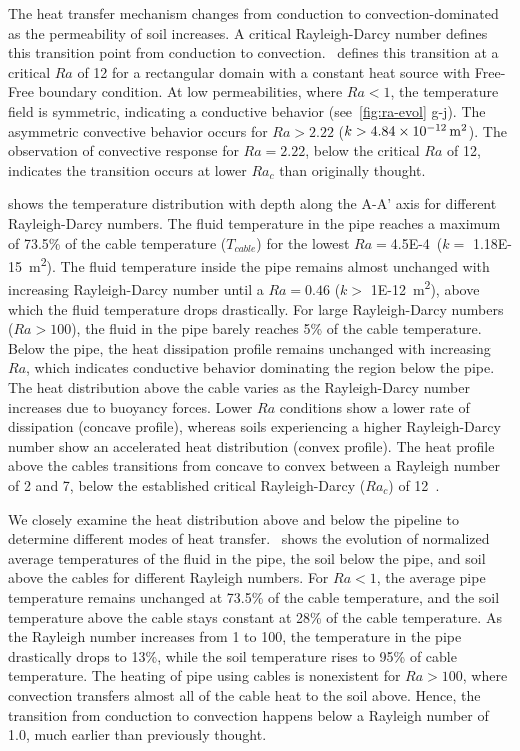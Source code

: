 \documentclass[Journal,letterpaper,InsideFigs]{ascelike-new}
\begin{document}
The heat transfer mechanism changes from conduction to convection-dominated as the permeability of soil increases. A critical Rayleigh-Darcy number defines this transition point from conduction to convection.~ defines this transition at a critical $Ra$ of 12 for a rectangular domain with a constant heat source with Free-Free boundary condition. At low permeabilities, where $Ra < 1$, the temperature field is symmetric, indicating a conductive behavior (see~\cref{fig:ra-evol} g-j). The asymmetric convective behavior occurs for $Ra > 2.22$ ($k > \SI{4.84E-12}{\meter\squared}$). The observation of convective response for $Ra = 2.22$, below the critical $Ra$ of 12, indicates the transition occurs at lower $Ra_c$ than originally thought. 

 shows the temperature distribution with depth along the A-A' axis for different Rayleigh-Darcy numbers. The fluid temperature in the pipe reaches a maximum of 73.5\% of the cable temperature ($T_{cable}$) for the lowest $Ra = $\SI{4.5E-4} ($k =$ \SI{1.18E-15}{\meter\squared}). The fluid temperature inside the pipe remains almost unchanged with increasing Rayleigh-Darcy number until a $Ra = 0.46$ ($k >$ \SI{1E-12}{\meter\squared}), above which the fluid temperature drops drastically. For large Rayleigh-Darcy numbers ($Ra > 100$), the fluid in the pipe barely reaches 5\% of the cable temperature. Below the pipe, the heat dissipation profile remains unchanged with increasing $Ra$, which indicates conductive behavior dominating the region below the pipe. The heat distribution above the cable varies as the Rayleigh-Darcy number increases due to buoyancy forces. Lower $Ra$ conditions show a lower rate of dissipation (concave profile), whereas soils experiencing a higher Rayleigh-Darcy number show an accelerated heat distribution (convex profile). The heat profile above the cables transitions from concave to convex between a Rayleigh number of 2 and 7, below the established critical Rayleigh-Darcy ($Ra_c$) of 12~\cite{nield1968onset}. 

We closely examine the heat distribution above and below the pipeline to determine different modes of heat transfer.~ shows the evolution of normalized average temperatures of the fluid in the pipe, the soil below the pipe, and soil above the cables for different Rayleigh numbers. For $Ra < 1$, the average pipe temperature remains unchanged at 73.5\% of the cable temperature, and the soil temperature above the cable stays constant at 28\% of the cable temperature. As the Rayleigh number increases from 1 to 100, the temperature in the pipe drastically drops to 13\%, while the soil temperature rises to 95\% of cable temperature. The heating of pipe using cables is nonexistent for $Ra > 100$, where convection transfers almost all of the cable heat to the soil above. Hence, the transition from conduction to convection happens below a Rayleigh number of 1.0, much earlier than previously thought.
\end{document}
